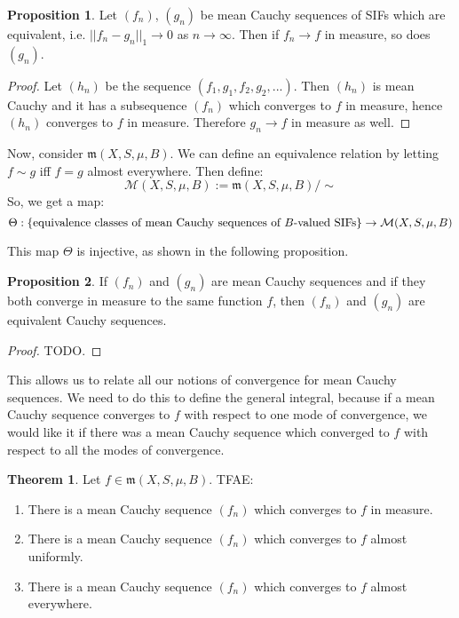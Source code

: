 \documentclass[11pt, oneside]{amsart}   	%
\theoremstyle{definition}
\newtheorem{theorem}{Theorem}[section]
\newtheorem{prop}{Proposition}[section]
\begin{document}
	 \begin{prop}
	 	Let $(f_n)$, $(g_n)$ be mean Cauchy sequences of SIFs which are equivalent, i.e. $||f_n - g_n||_1\rightarrow 0$ as 
		$n\rightarrow\infty$. Then if $f_n\rightarrow f$ in measure, so does $(g_n)$. 
	 \end{prop}
	 
	 \begin{proof}
	 	Let $(h_n)$ be the sequence $(f_1, g_1, f_2, g_2, ...)$. Then $(h_n)$ is mean Cauchy and it has a subsequence 
		$(f_n)$ which converges to $f$ in measure, hence $(h_n)$ converges to $f$ in measure. Therefore $g_n\rightarrow 
		f$ in measure as well.
	 \end{proof}
	 
	 Now, consider $\mathfrak m(X, S, \mu, B)$. We can define an equivalence relation by letting $f\sim g$ iff $f = g$ almost 
	 everywhere. Then define:
	 $$
	 	\mathcal M(X, S, \mu, B) := \mathfrak m(X, S, \mu, B) / \sim
	 $$
	 So, we get a map:
	 $$
	 	\Theta : \{\textnormal{equivalence classes of mean Cauchy sequences of } B \textnormal{-valued SIFs}\}\rightarrow 
		\mathcal M(X, S, \mu, B)
	 $$
	 
	 This map $\Theta$ is injective, as shown in the following proposition.
	 
	 \begin{prop}
	 	If $(f_n)$ and $(g_n)$ are mean Cauchy sequences and if they both converge in measure to the same function $f$, 
		then $(f_n)$ and $(g_n)$ are equivalent Cauchy sequences. 
	 \end{prop}
	 
	 \begin{proof}
		TODO.
	 \end{proof}
	 
	This allows us to relate all our notions of convergence for mean Cauchy sequences. We need to do this to define the 
	general integral, because if a mean Cauchy sequence converges to $f$ with respect to one mode of convergence, we 
	would like it if there was a mean Cauchy sequence which converged to $f$ with respect to all the modes of convergence.
	
	\begin{theorem}
		Let $f\in\mathfrak m(X, S, \mu, B)$. TFAE:
		\begin{enumerate}
			\item There is a mean Cauchy sequence $(f_n)$ which converges to $f$ in measure.
			\item There is a mean Cauchy sequence $(f_n)$ which converges to $f$ almost uniformly.
			\item There is a mean Cauchy sequence $(f_n)$ which converges to $f$ almost everywhere.
		\end{enumerate}
	\end{theorem}
	
\end{document}
